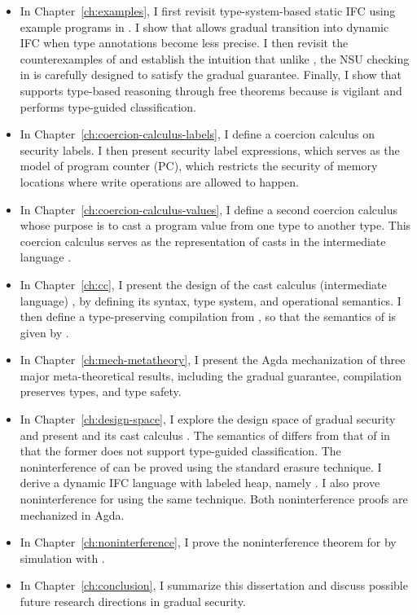 \begin{itemize}
  \item In Chapter~\ref{ch:examples}, I first revisit type-system-based static
    IFC using example programs in \Surface. I show that \Surface allows gradual
    transition into dynamic IFC when type annotations become less precise. I
    then revisit the counterexamples of \textcite{Toro:2018aa} and establish the
    intuition that unlike \GSLRef, the NSU checking in \Surface is carefully
    designed to satisfy the gradual guarantee. Finally, I show that \Surface
    supports type-based reasoning through free theorems because \Surface is
    vigilant and performs type-guided classification.
  \item In Chapter~\ref{ch:coercion-calculus-labels}, I define a coercion
    calculus on security labels. I then present security label expressions,
    which serves as the model of program counter (PC), which restricts the
    security of memory locations where write operations are allowed to happen.
  \item In Chapter~\ref{ch:coercion-calculus-values}, I define a second coercion
    calculus whose purpose is to cast a program value from one type to another
    type. This coercion calculus serves as the representation of casts in the
    intermediate language \CC.
  \item In Chapter~\ref{ch:cc}, I present the design of the cast calculus
    (intermediate language) \CC, by defining its syntax, type system, and
    operational semantics. I then define a type-preserving compilation from
    \Surface, so that the semantics of \Surface is given by \CC.
  \item In Chapter~\ref{ch:mech-metatheory}, I present the Agda mechanization of
    three major meta-theoretical results, including the gradual guarantee,
    compilation preserves types, and type safety.
  \item In Chapter~\ref{ch:design-space}, I explore the design space of gradual
    security and present \SurfaceOld and its cast calculus \CCOld. The semantics
    of \SurfaceOld differs from that of \Surface in that the former does not
    support type-guided classification. The noninterference of \CCOld can be proved
    using the standard erasure technique. I derive a dynamic IFC language with
    labeled heap, namely \DynIFC. I also prove noninterference for \DynIFC using
    the same technique. Both noninterference proofs are mechanized in Agda.
  \item In Chapter~\ref{ch:noninterference}, I prove the noninterference theorem
    for \Surface by simulation with \DynIFC.
  \item In Chapter~\ref{ch:conclusion}, I summarize this dissertation and
    discuss possible future research directions in gradual security.
\end{itemize}

